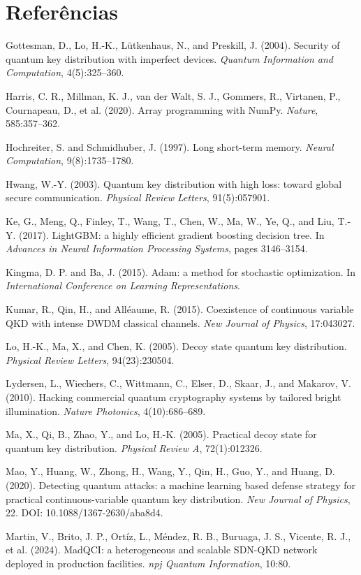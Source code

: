 \documentclass[12pt]{article}
\makeatletter
\renewenvironment{thebibliography}[1]{%
  \section*{Refer\^encias}%
  \list{}{\usecounter{enumiv}\let\p@enumiv\@empty%
    \renewcommand\theenumiv{\@arabic\c@enumiv}%
    \setlength{\labelwidth}{0pt}\setlength{\labelsep}{0pt}%
    \setlength{\leftmargin}{1.6em}\setlength{\itemindent}{-1.6em}%
    \setlength{\itemsep}{0.35em}\setlength{\parsep}{0pt}}%
  \small\sloppy\clubpenalty4000\widowpenalty4000%
  \let\@noitemerr\relax}%
 {\endlist}
\makeatother
\begin{document}
\begin{thebibliography}{99}
\bibitem{} Gottesman, D., Lo, H.-K., Lütkenhaus, N., and Preskill, J. (2004).
Security of quantum key distribution with imperfect devices. \textit{Quantum
Information and Computation}, 4(5):325--360.

\bibitem{} Harris, C. R., Millman, K. J., van der Walt, S. J., Gommers, R.,
Virtanen, P., Cournapeau, D., et al. (2020). Array programming with NumPy.
\textit{Nature}, 585:357--362.

\bibitem{} Hochreiter, S. and Schmidhuber, J. (1997). Long short-term memory.
\textit{Neural Computation}, 9(8):1735--1780.

\bibitem{} Hwang, W.-Y. (2003). Quantum key distribution with high loss: toward
global secure communication. \textit{Physical Review Letters}, 91(5):057901.

\bibitem{} Ke, G., Meng, Q., Finley, T., Wang, T., Chen, W., Ma, W., Ye, Q., and
Liu, T.-Y. (2017). LightGBM: a highly efficient gradient boosting decision tree.
In \textit{Advances in Neural Information Processing Systems}, pages 3146--3154.

\bibitem{} Kingma, D. P. and Ba, J. (2015). Adam: a method for stochastic
optimization. In \textit{International Conference on Learning Representations}.

\bibitem{} Kumar, R., Qin, H., and Alléaume, R. (2015). Coexistence of continuous
variable QKD with intense DWDM classical channels. \textit{New Journal of
Physics}, 17:043027.

\bibitem{} Lo, H.-K., Ma, X., and Chen, K. (2005). Decoy state quantum key
distribution. \textit{Physical Review Letters}, 94(23):230504.

\bibitem{} Lydersen, L., Wiechers, C., Wittmann, C., Elser, D., Skaar, J., and
Makarov, V. (2010). Hacking commercial quantum cryptography systems by tailored
bright illumination. \textit{Nature Photonics}, 4(10):686--689.

\bibitem{} Ma, X., Qi, B., Zhao, Y., and Lo, H.-K. (2005). Practical decoy state
for quantum key distribution. \textit{Physical Review A}, 72(1):012326.

\bibitem{} Mao, Y., Huang, W., Zhong, H., Wang, Y., Qin, H., Guo, Y., and Huang,
D. (2020). Detecting quantum attacks: a machine learning based defense strategy
for practical continuous-variable quantum key distribution. \textit{New Journal of
Physics}, 22. DOI: 10.1088/1367-2630/aba8d4.

\bibitem{} Martin, V., Brito, J. P., Ortíz, L., Méndez, R. B., Buruaga, J. S.,
Vicente, R. J., et al. (2024). MadQCI: a heterogeneous and scalable SDN-QKD
network deployed in production facilities. \textit{npj Quantum Information},
10:80.


\end{thebibliography}
\end{document}
